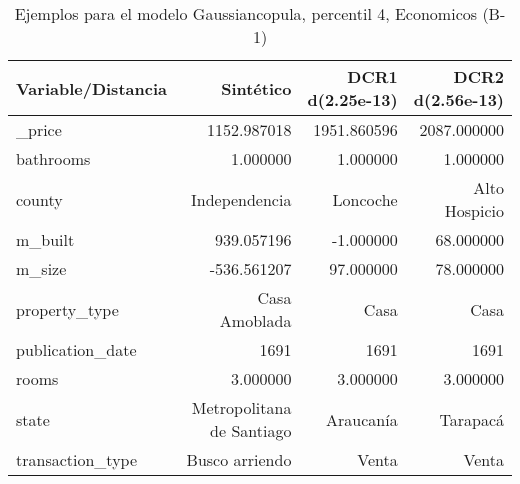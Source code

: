 \begin{table}[H]
\centering
\fontsize{10}{14}\selectfont
\caption{Ejemplos para el modelo Gaussiancopula, percentil 4, Economicos (B-1)}
\label{table-example-economicos-b-1-gaussiancopula-4p}
\begin{tabular}{|l|r|r|r|}
\hline
\rowcolor[gray]{0.8}
Variable/Distancia & Sintético & DCR1 d(2.25e-13) & DCR2 d(2.56e-13) \\
\hline \_price & \cellcolor[rgb]{0.9, 0.54, 0.52} 1152.987018 & 1951.860596 & 2087.000000 \\
\hline bathrooms & \cellcolor[rgb]{0.9, 0.54, 0.52} 1.000000 & \cellcolor[rgb]{0.9, 0.54, 0.52} 1.000000 & \cellcolor[rgb]{0.9, 0.54, 0.52} 1.000000 \\
\hline county & \cellcolor[rgb]{0.9, 0.54, 0.52} Independencia & Loncoche & Alto Hospicio \\
\hline m\_built & \cellcolor[rgb]{0.9, 0.54, 0.52} 939.057196 & -1.000000 & 68.000000 \\
\hline m\_size & \cellcolor[rgb]{0.9, 0.54, 0.52} -536.561207 & 97.000000 & 78.000000 \\
\hline property\_type & \cellcolor[rgb]{0.9, 0.54, 0.52} Casa Amoblada & Casa & Casa \\
\hline publication\_date & \cellcolor[rgb]{0.9, 0.54, 0.52} 1691 & \cellcolor[rgb]{0.9, 0.54, 0.52} 1691 & \cellcolor[rgb]{0.9, 0.54, 0.52} 1691 \\
\hline rooms & \cellcolor[rgb]{0.9, 0.54, 0.52} 3.000000 & \cellcolor[rgb]{0.9, 0.54, 0.52} 3.000000 & \cellcolor[rgb]{0.9, 0.54, 0.52} 3.000000 \\
\hline state & \cellcolor[rgb]{0.9, 0.54, 0.52} Metropolitana de Santiago & Araucanía & Tarapacá \\
\hline transaction\_type & \cellcolor[rgb]{0.9, 0.54, 0.52} Busco arriendo & Venta & Venta \\
\hline
\end{tabular}
\end{table}
